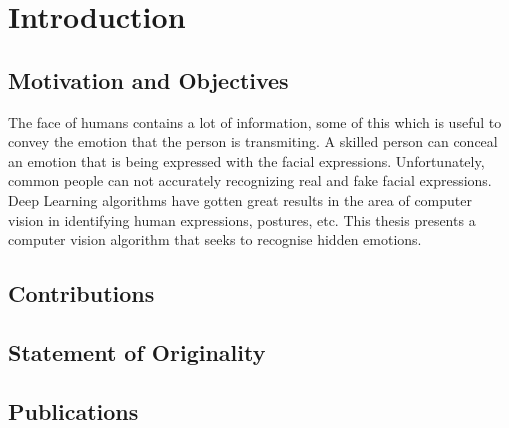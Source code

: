 \chapter{Introduction}

\section{Motivation and Objectives}

The face of humans contains a lot of information, some of this which is useful to convey the emotion that the person is transmiting. A skilled person can conceal an emotion that is being expressed with the facial expressions. Unfortunately, common people can not accurately recognizing real and fake facial expressions. Deep Learning algorithms have gotten great results in the area of computer vision in identifying human expressions, postures, etc. This thesis presents a computer vision algorithm that seeks to recognise hidden emotions.

\section{Contributions}


\section{Statement of Originality}


\section{Publications}
